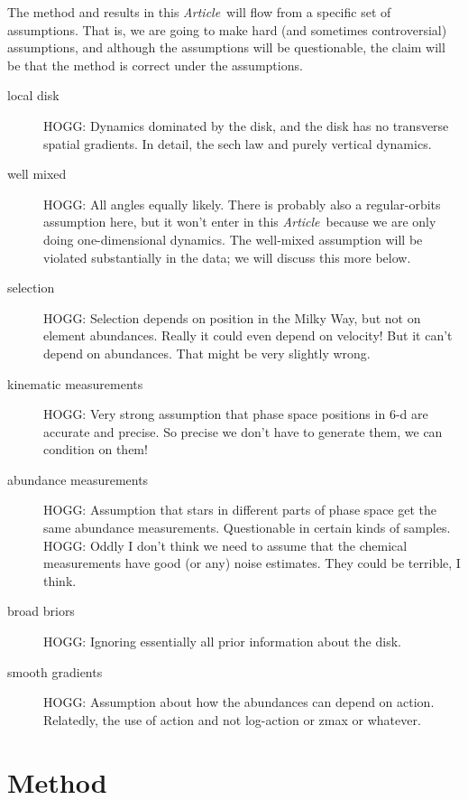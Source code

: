 \documentclass[modern]{aastex62}
\newcommand{\documentname}{\textsl{Article}}
\begin{document}
The method and results in this \documentname\ will flow from a specific set of
assumptions.
That is, we are going to make hard (and sometimes controversial) assumptions,
and although the assumptions will be questionable, the claim will be that the
method is correct under the assumptions.
\begin{description}
\item[local disk] HOGG: Dynamics dominated by the disk,
and the disk has no transverse spatial gradients. In detail, the sech law and purely
vertical dynamics.

\item[well mixed] HOGG: All angles equally likely. There is probably also a regular-orbits
assumption here, but it won't enter in this \documentname\ because we are only doing
one-dimensional dynamics. The well-mixed assumption will be violated substantially in the data;
we will discuss this more below.

\item[selection] HOGG: Selection depends on position in the Milky Way, but not
on element abundances. Really it could even depend on velocity! But it can't depend
on abundances. That might be very slightly wrong.

\item[kinematic measurements] HOGG: Very strong assumption that phase space positions
in 6-d are accurate and precise. So precise we don't have to generate them, we can
condition on them!

\item[abundance measurements] HOGG: Assumption that stars in different parts of phase
space get the same abundance measurements. Questionable in certain kinds of samples.
HOGG: Oddly I don't think we need to assume that the chemical measurements have good
(or any) noise estimates. They could be terrible, I think.

\item[broad briors] HOGG: Ignoring essentially all prior information about the disk.

\item[smooth gradients] HOGG: Assumption about how the abundances can depend on action.
Relatedly, the use of action and not log-action or zmax or whatever.
\end{description}

\section{Method}
\end{document}
